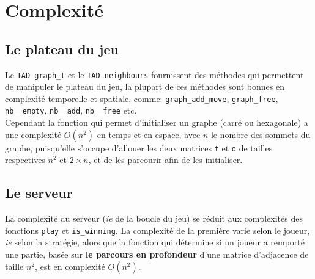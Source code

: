 \documentclass[a4paper,10pt]{article}
\begin{document}
\section{Complexité}
\subsection{Le plateau du jeu}
Le \texttt{TAD graph\_t} et le \texttt{TAD neighbours} fournissent des méthodes qui permettent de manipuler le plateau du jeu, la plupart de ces méthodes sont bonnes en complexité temporelle et spatiale, comme: \texttt{graph\_add\_move}, \texttt{graph\_free}, \texttt{nb\_\_empty}, \texttt{nb\_\_add}, \texttt{nb\_\_free} etc.\\
Cependant la fonction qui permet d'initialiser un graphe (carré ou hexagonale) a une complexité $O(n^2)$ en temps et en espace, avec $n$ le nombre des sommets du graphe, puisqu'elle s'occupe d'allouer les deux matrices \texttt{t} et \texttt{o} de tailles respectives $n^2$ et $2\times n$, et de les parcourir afin de les initialiser.
\subsection{Le serveur}
La complexité du serveur (\emph{ie} de la boucle du jeu) se réduit aux complexités des fonctions \texttt{play} et \texttt{is\_winning}. La complexité de la première varie selon le joueur, \emph{ie} selon la stratégie, alors que la fonction qui détermine si un joueur a remporté une partie, basée sur \textbf{le parcours en profondeur} d'une matrice d'adjacence de taille $n^2$, est en complexité $O(n^2)$.
\end{document}
